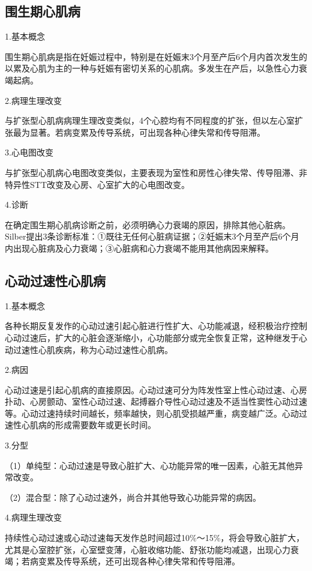 \protect\hypertarget{text00051.htmlux5cux23subid619}{}{}

\subsection{围生期心肌病}

1.基本概念

围生期心肌病是指在妊娠过程中，特别是在妊娠末3个月至产后6个月内首次发生的以累及心肌为主的一种与妊娠有密切关系的心肌病。多发生在产后，以急性心力衰竭起病。

2.病理生理改变

与扩张型心肌病病理生理改变类似，4个心腔均有不同程度的扩张，但以左心室扩张最为显著。若病变累及传导系统，可出现各种心律失常和传导阻滞。

3.心电图改变

与扩张型心肌病心电图改变类似，主要表现为室性和房性心律失常、传导阻滞、非特异性STT改变及心房、心室扩大的心电图改变。

4.诊断

在确定围生期心肌病诊断之前，必须明确心力衰竭的原因，排除其他心脏病。Silber提出3条诊断标准：①既往无任何心脏病证据；②妊娠末3个月至产后6个月内出现心脏病及心力衰竭；③心脏病和心力衰竭不能用其他病因来解释。

\protect\hypertarget{text00051.htmlux5cux23subid620}{}{}

\subsection{心动过速性心肌病}

1.基本概念

各种长期反复发作的心动过速引起心脏进行性扩大、心功能减退，经积极治疗控制心动过速后，扩大的心脏会逐渐缩小，心功能部分或完全恢复正常，这种继发于心动过速性心肌疾病，称为心动过速性心肌病。

2.病因

心动过速是引起心肌病的直接原因。心动过速可分为阵发性室上性心动过速、心房扑动、心房颤动、室性心动过速、起搏器介导性心动过速及不适当性窦性心动过速等。心动过速持续时间越长，频率越快，则心肌受损越严重，病变越广泛。心动过速性心肌病的形成需要数年或更长时间。

3.分型

（1）单纯型：心动过速是导致心脏扩大、心功能异常的唯一因素，心脏无其他异常改变。

（2）混合型：除了心动过速外，尚合并其他导致心功能异常的病因。

4.病理生理改变

持续性心动过速或心动过速每天发作总时间超过10\%～15\%，将会导致心脏扩大，尤其是心室腔扩张，心室壁变薄，心脏收缩功能、舒张功能均减退，出现心力衰竭；若病变累及传导系统，还可出现各种心律失常和传导阻滞。

